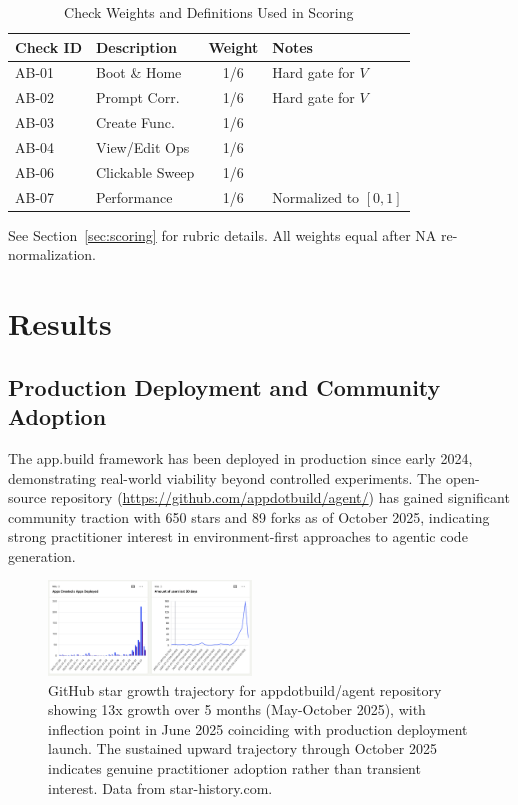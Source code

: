 \documentclass[conference]{IEEEtran}
\begin{document}
\begin{table}[!t]
\caption{Check Weights and Definitions Used in Scoring}
\label{tab:check-weights}
\centering
\small
\begin{threeparttable}
\begin{tabular}{@{}llcp{3cm}@{}}
\toprule
\textbf{Check ID} & \textbf{Description} & \textbf{Weight} & \textbf{Notes} \\
\midrule
AB-01 & Boot \& Home & 1/6 & Hard gate for $V$ \\
AB-02 & Prompt Corr. & 1/6 & Hard gate for $V$ \\
AB-03 & Create Func. & 1/6 &  \\
AB-04 & View/Edit Ops & 1/6 &  \\
AB-06 & Clickable Sweep & 1/6 &  \\
AB-07 & Performance & 1/6 & Normalized to $[0,1]$ \\
\bottomrule
\end{tabular}
\begin{tablenotes}\footnotesize
\item See Section~\ref{sec:scoring} for rubric details. All weights equal after NA re-normalization.
\end{tablenotes}
\end{threeparttable}
\end{table}

\section{Results}
\label{sec:results}

\subsection{Production Deployment and Community Adoption}

The app.build framework has been deployed in production since early 2024, demonstrating real-world viability beyond controlled experiments. The open-source repository (\url{https://github.com/appdotbuild/agent/}) has gained significant community traction with 650 stars and 89 forks as of October 2025, indicating strong practitioner interest in environment-first approaches to agentic code generation.

\begin{figure}[!t]
\centering
\includegraphics[width=0.48\textwidth]{diagrams/star-history.png}
\caption{GitHub star growth trajectory for appdotbuild/agent repository showing 13x growth over 5 months (May-October 2025), with inflection point in June 2025 coinciding with production deployment launch. The sustained upward trajectory through October 2025 indicates genuine practitioner adoption rather than transient interest. Data from star-history.com.}
\label{fig:star-history}
\end{figure}
\end{document}
